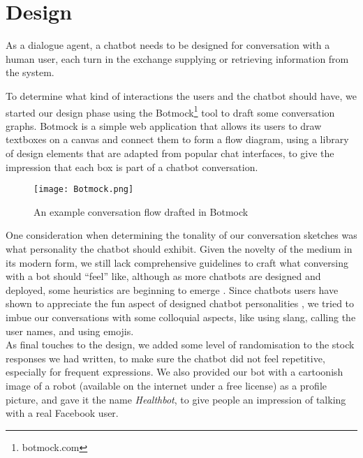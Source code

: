 \section{Design}
As a dialogue agent, a chatbot needs to be designed for conversation with a human user, each turn in the exchange supplying or retrieving information from the system.

To determine what kind of interactions the users and the chatbot should have, we started our design phase using the Botmock\footnote{botmock.com} tool to draft some conversation graphs. Botmock is a simple web application that allows its users to draw textboxes on a canvas and connect them to form a flow diagram, using a library of design elements that are adapted from popular chat interfaces, to give the impression that each box is part of a chatbot conversation.

\begin{figure}[h!]
  \texttt{[image: Botmock.png]}
  \caption{An example conversation flow drafted in Botmock}
\end{figure}
One consideration when determining the tonality of our conversation sketches was what personality the chatbot should exhibit. Given the novelty of the medium in its modern form, we still lack comprehensive guidelines to craft what conversing with a bot should ``feel'' like, although as more chatbots are designed and deployed, some heuristics are beginning to emerge \cite{jessie}. Since chatbots users have shown to appreciate the fun aspect of designed chatbot personalities \cite{10.1007/978-3-319-67744-6_28}, we tried to imbue our conversations with some colloquial aspects, like using slang, calling the user names, and using emojis. \\
As final touches to the design, we added some level of randomisation to the stock responses we had written, to make sure the chatbot did not feel repetitive, especially for frequent expressions. We also provided our bot with a cartoonish image of a robot (available on the internet under a free license) as a profile picture, and gave it the name \textit{Healthbot}, to give people an impression of talking with a real Facebook user.
